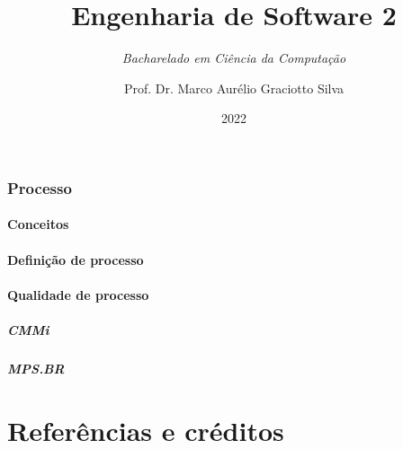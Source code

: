 \documentclass[utf8, english, brazil, usepdftitle=false, svgnames, color={table, fixpdftex, hyperref, fixinclude, xcdraw}, t]{beamer}
\title[]{\large Engenharia de Software 2}
\subtitle{\textit{Bacharelado em Ciência da Computação}}
\author[UTFPR]{Prof. Dr. Marco Aurélio Graciotto Silva}
\date[]{2022}
\begin{document}
\frontmatter{}


\mainmatter{}


\section{Processo}

\subsection{Conceitos}


\subsection{Definição de processo}



\subsection{Qualidade de processo}


% 

\subsubsection{CMMi}


\subsubsection{MPS.BR}


%

%


\backmatter{}
\part{Referências e créditos}

\end{document}

